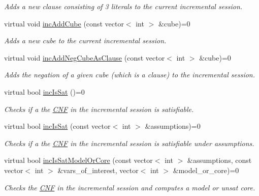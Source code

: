 \begin{DoxyCompactItemize}
\begin{DoxyCompactList}\small\item\em Adds a new clause consisting of 3 literals to the current incremental session. \end{DoxyCompactList}\item 
virtual void \hyperlink{classSatSolver_a1f04f34bb04174489ed18d0b62241004}{inc\-Add\-Cube} (const vector$<$ int $>$ \&cube)=0
\begin{DoxyCompactList}\small\item\em Adds a new cube to the current incremental session. \end{DoxyCompactList}\item 
virtual void \hyperlink{classSatSolver_a6be2c564289a59057c4c6728a3aa9c2b}{inc\-Add\-Neg\-Cube\-As\-Clause} (const vector$<$ int $>$ \&cube)=0
\begin{DoxyCompactList}\small\item\em Adds the negation of a given cube (which is a clause) to the incremental session. \end{DoxyCompactList}\item 
virtual bool \hyperlink{classSatSolver_ab1aab4b96a36b2003450067a3799ae23}{inc\-Is\-Sat} ()=0
\begin{DoxyCompactList}\small\item\em Checks if a the \hyperlink{classCNF}{C\-N\-F} in the incremental session is satisfiable. \end{DoxyCompactList}\item 
virtual bool \hyperlink{classSatSolver_a1864787a33621efac7fc75fb6b25f080}{inc\-Is\-Sat} (const vector$<$ int $>$ \&assumptions)=0
\begin{DoxyCompactList}\small\item\em Checks if a the \hyperlink{classCNF}{C\-N\-F} in the incremental session is satisfiable under assumptions. \end{DoxyCompactList}\item 
virtual bool \hyperlink{classSatSolver_ad387fc06bacf2d48847f779c9db8461a}{inc\-Is\-Sat\-Model\-Or\-Core} (const vector$<$ int $>$ \&assumptions, const vector$<$ int $>$ \&vars\-\_\-of\-\_\-interest, vector$<$ int $>$ \&model\-\_\-or\-\_\-core)=0
\begin{DoxyCompactList}\small\item\em Checks the \hyperlink{classCNF}{C\-N\-F} in the incremental session and computes a model or unsat core. \end{DoxyCompactList}\item 

\end{DoxyCompactItemize}
